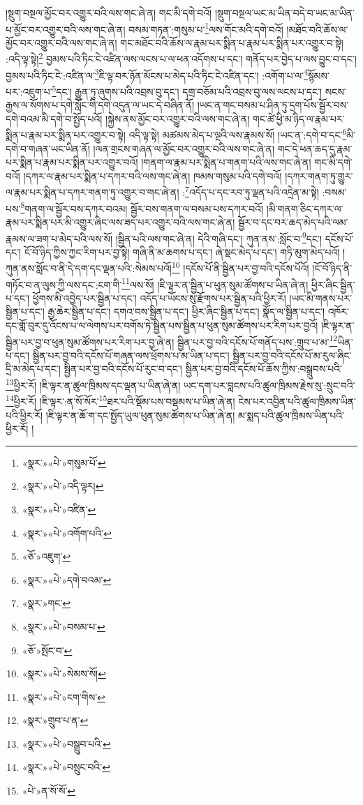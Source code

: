 །སྡུག་བསྔལ་མྱོང་བར་འགྱུར་བའི་ལས་གང་ཞེ་ན། གང་མི་དགེ་བའོ། །སྡུག་བསྔལ་ཡང་མ་ཡིན་བདེ་བ་ཡང་མ་ཡིན་པ་མྱོང་བར་འགྱུར་བའི་ལས་གང་ཞེ་ན། བསམ་གཏན་:གསུམ་པ་\footnote{«སྣར་»«པེ་»གསུམ་པོ་}ལས་གོང་མའི་དགེ་བའོ། །མཐོང་བའི་ཆོས་ལ་མྱོང་བར་འགྱུར་བའི་ལས་གང་ཞེ་ན། གང་མཐོང་བའི་ཆོས་ལ་རྣམ་པར་སྨིན་པ་རྣམ་པར་སྨིན་པར་འགྱུར་བ་སྟེ། :འདི་ལྟ་སྟེ།\footnote{«སྣར་»«པེ་»འདི་ལྟར།} བྱམས་པའི་ཏིང་ངེ་འཛིན་ལས་ལངས་པ་ལ་ཕན་འདོགས་པ་དང་། གནོད་པར་བྱེད་པ་ལས་བྱུང་བ་དང་། བྱམས་པའི་ཏིང་ངེ་:འཛིན་ལ་\footnote{«སྣར་»«པེ་»འཛིན་}ཇི་ལྟ་བར་ཉོན་མོངས་པ་མེད་པའི་ཏིང་ངེ་འཛིན་དང་། :འགོག་པ་ལ་\footnote{«སྣར་»«པེ་»འགོག་པའི་}སྙོམས་པར་:འཇུག་པ་\footnote{«ཅོ་»འཇུག་}དང་། རྒྱུན་ཏུ་ཞུགས་པའི་འབྲས་བུ་དང་། དགྲ་བཅོམ་པའི་འབྲས་བུ་ལས་ལངས་པ་དང་། སངས་རྒྱས་ལ་སོགས་པ་དགེ་སློང་གི་དགེ་འདུན་ལ་ཡང་དེ་བཞིན་ནོ། །ཡང་ན་གང་བསམ་པ་ཤིན་ཏུ་དྲག་པོས་སྦྱོར་བས་དགེ་བའམ་མི་དགེ་བ་སྤྱོད་པའོ། །སྐྱེས་ནས་མྱོང་བར་འགྱུར་བའི་ལས་གང་ཞེ་ན། གང་ཚེ་ཕྱི་མ་ཉིད་ལ་རྣམ་པར་སྨིན་པ་རྣམ་པར་སྨིན་པར་འགྱུར་བ་སྟེ། འདི་ལྟ་སྟེ། མཚམས་མེད་པ་ལྔའི་ལས་རྣམས་སོ། །ཡང་ན་:དགེ་བ་དང་\footnote{«སྣར་»«པེ་»དགེ་བའམ་}མི་དགེ་བ་གཞན་ཡང་ཡིན་ནོ། །ལན་གྲངས་གཞན་ལ་མྱོང་བར་འགྱུར་བའི་ལས་གང་ཞེ་ན། གང་དེ་ཕན་ཆད་དུ་རྣམ་པར་སྨིན་པ་རྣམ་པར་སྨིན་པར་འགྱུར་བའོ། །གནག་ལ་རྣམ་པར་སྨིན་པ་གནག་པའི་ལས་གང་ཞེ་ན། གང་མི་དགེ་བའོ། །དཀར་ལ་རྣམ་པར་སྨིན་པ་དཀར་བའི་ལས་གང་ཞེ་ན། ཁམས་གསུམ་པའི་དགེ་བའོ། །དཀར་གནག་ཏུ་གྱུར་ལ་རྣམ་པར་སྨིན་པ་དཀར་གནག་ཏུ་འགྱུར་བ་གང་ཞེ་ན། :\footnote{«སྣར་»གང་}འདོད་པ་དང་རབ་ཏུ་ལྡན་པའི་འདྲེན་མ་སྟེ། :བསམ་པས་\footnote{«སྣར་»«པེ་»བསམ་པ་}གནག་ལ་སྦྱོར་བས་དཀར་བའམ། སྦྱོར་བས་གནག་ལ་བསམ་པས་དཀར་བའོ། །མི་གནག་ཅིང་དཀར་ལ་རྣམ་པར་སྨིན་པར་མི་འགྱུར་ཞིང་ལས་ཟད་པར་འགྱུར་བའི་ལས་གང་ཞེ་ན། སྦྱོར་བ་དང་བར་ཆད་མེད་པའི་ལམ་རྣམས་ལ་ཟག་པ་མེད་པའི་ལས་སོ། །སྦྱིན་པའི་ལས་གང་ཞེ་ན། དེའི་གཞི་དང་། ཀུན་ནས་:སློང་བ་\footnote{«ཅོ་»སྤོང་བ་}དང་། དངོས་པོ་དང་། ངོ་བོ་ཉིད་ཀྱིས་ཀྱང་རིག་པར་བྱ་སྟེ། གཞི་ནི་མ་ཆགས་པ་དང་། ཞེ་སྡང་མེད་པ་དང་། གཏི་མུག་མེད་པའོ། །ཀུན་ནས་སློང་བ་ནི་དེ་དག་དང་ལྡན་པའི་:སེམས་པའོ།\footnote{«སྣར་»«པེ་»སེམས་སོ།} །དངོས་པོ་ནི་སྦྱིན་པར་བྱ་བའི་དངོས་པོའོ། །ངོ་བོ་ཉིད་ནི་གཏོང་བ་ན་ལུས་ཀྱི་ལས་དང་:ངག་གི་\footnote{«སྣར་»«པེ་»ངག་གིས་}ལས་སོ། །ཇི་ལྟར་ན་སྦྱིན་པ་ཕུན་སུམ་ཚོགས་པ་ཡིན་ཞེ་ན། ཕྱིར་ཞིང་སྦྱིན་པ་དང་། ཕྱོགས་མི་འབྱེད་པར་སྦྱིན་པ་དང་། འདོད་པ་ཡོངས་སུ་རྫོགས་པར་སྦྱིན་པའི་ཕྱིར་རོ། །ཡང་མི་གནས་པར་སྦྱིན་པ་དང་། རྒྱ་ཆེར་སྦྱིན་པ་དང་། དགའ་བས་སྦྱིན་པ་དང་། ཕྱིར་ཞིང་སྦྱིན་པ་དང་། སྣོད་ལ་སྦྱིན་པ་དང་། འཁོར་དང་གློ་བུར་དུ་འོངས་པ་ལ་ལེགས་པར་བགོས་ཏེ་སྦྱིན་པས་སྦྱིན་པ་ཕུན་སུམ་ཚོགས་པར་རིག་པར་བྱའོ། །ཇི་ལྟར་ན་སྦྱིན་པར་བྱ་བ་ཕུན་སུམ་ཚོགས་པར་རིག་པར་བྱ་ཞེ་ན། སྦྱིན་པར་བྱ་བའི་དངོས་པོ་གནོད་པས་:གྲུབ་པ་མ་\footnote{«སྣར་»གྲུབ་པ་ན་}ཡིན་པ་དང་། སྦྱིན་པར་བྱ་བའི་དངོས་པོ་གཞན་ལས་ཕྲོགས་པ་མ་ཡིན་པ་དང་། སྦྱིན་པར་བྱ་བའི་དངོས་པོ་མ་རུལ་ཞིང་དྲི་མ་མེད་པ་དང་། སྦྱིན་པར་བྱ་བའི་དངོས་པོ་རུང་བ་དང་། སྦྱིན་པར་བྱ་བའི་དངོས་པོ་ཆོས་ཀྱིས་:བསྒྲུབས་པའི་\footnote{«སྣར་»«པེ་»བསྒྲུབ་པའི་}ཕྱིར་རོ། །ཇི་ལྟར་ན་ཚུལ་ཁྲིམས་དང་ལྡན་པ་ཡིན་ཞེ་ན། ཡང་དག་པར་བླངས་པའི་ཚུལ་ཁྲིམས་རྗེས་སུ་:སྲུང་བའི་\footnote{«སྣར་»«པེ་»བསྲུང་བའི་}ཕྱིར་རོ། །ཇི་ལྟར་:ན་སོ་སོར་\footnote{«པེ་»ན་སོ་སོ་}ཐར་པའི་སྡོམ་པས་བསྡམས་པ་ཡིན་ཞེ་ན། ངེས་པར་འབྱིན་པའི་ཚུལ་ཁྲིམས་ཡིན་པའི་ཕྱིར་རོ། །ཇི་ལྟར་ན་ཆོ་ག་དང་སྤྱོད་ཡུལ་ཕུན་སུམ་ཚོགས་པ་ཡིན་ཞེ་ན། མ་སྨད་པའི་ཚུལ་ཁྲིམས་ཡིན་པའི་ཕྱིར་རོ། །
